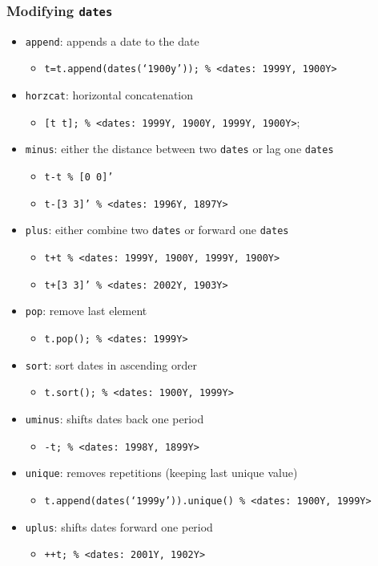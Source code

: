 \documentclass[10pt]{beamer}
\begin{document}
\begin{frame}[fragile,t]
  \frametitle{Modifying \texttt{dates}}
  \begin{itemize}
  \item \texttt{append}: appends a date to the date
    \begin{itemize}
    \item \texttt{t=t.append(dates(`1900y')); \% <dates: 1999Y, 1900Y>}
    \end{itemize}
  \item \texttt{horzcat}: horizontal concatenation
    \begin{itemize}
    \item \texttt{[t t]; \% <dates: 1999Y, 1900Y, 1999Y, 1900Y>};
    \end{itemize}
  \item \texttt{minus}: either the distance between two \texttt{dates} or lag one \texttt{dates}
    \begin{itemize}
    \item \texttt{t-t \% [0 0]'}
    \item \texttt{t-[3 3]' \% <dates: 1996Y, 1897Y>}
    \end{itemize}
  \item \texttt{plus}: either combine two \texttt{dates} or forward one \texttt{dates}
    \begin{itemize}
    \item \texttt{t+t \% <dates: 1999Y, 1900Y, 1999Y, 1900Y>}
    \item \texttt{t+[3 3]' \% <dates: 2002Y, 1903Y>}
    \end{itemize}
  \item \texttt{pop}: remove last element
    \begin{itemize}
    \item \texttt{t.pop(); \% <dates: 1999Y>}
    \end{itemize}
  \item \texttt{sort}: sort dates in ascending order
    \begin{itemize}
    \item \texttt{t.sort(); \% <dates: 1900Y, 1999Y>}
    \end{itemize}
  \item \texttt{uminus}: shifts dates back one period
    \begin{itemize}
    \item \texttt{-t; \% <dates: 1998Y, 1899Y>}
    \end{itemize}
  \item \texttt{unique}: removes repetitions (keeping last unique value)
    \begin{itemize}
    \item \texttt{t.append(dates(`1999y')).unique() \% <dates: 1900Y, 1999Y>}
    \end{itemize}
  \item \texttt{uplus}: shifts dates forward one period
    \begin{itemize}
    \item \texttt{++t; \% <dates: 2001Y, 1902Y>}
    \end{itemize}
  \end{itemize}
\end{frame}
\end{document}
